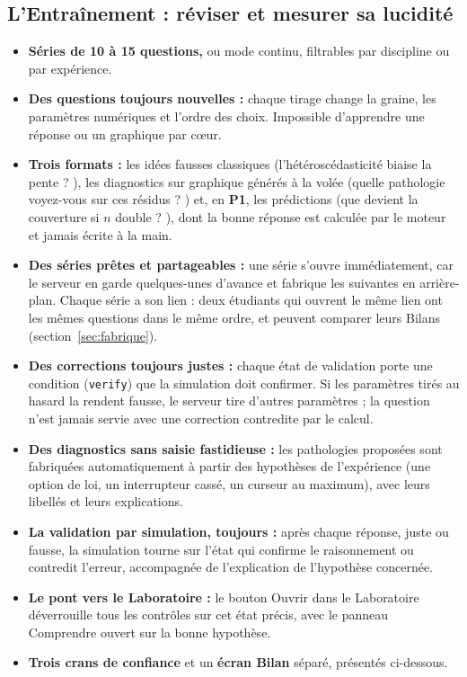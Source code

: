\documentclass[11pt,a4paper]{article}
\newcommand{\pone}{\colorbox{ctMethod!18}{\footnotesize\textbf{P1}}}
\begin{document}
\subsection{L'Entraînement : réviser et mesurer sa lucidité}
\begin{itemize}[leftmargin=*]
  \item \textbf{Séries de 10 à 15 questions,} ou mode continu, filtrables par discipline ou par expérience.
  \item \textbf{Des questions toujours nouvelles :} chaque tirage change la graine, les paramètres numériques et l'ordre des choix. Impossible d'apprendre une réponse ou un graphique par cœur.
  \item \textbf{Trois formats :} les idées fausses classiques (\og l'hétéroscédasticité biaise la pente ? \fg{}), les diagnostics sur graphique générés à la volée (\og quelle pathologie voyez-vous sur ces résidus ? \fg{}) et, en \pone{}, les prédictions (\og que devient la couverture si $n$ double ? \fg{}), dont la bonne réponse est calculée par le moteur et jamais écrite à la main.
  \item \textbf{Des séries prêtes et partageables :} une série s'ouvre immédiatement, car le serveur en garde quelques-unes d'avance et fabrique les suivantes en arrière-plan. Chaque série a son lien : deux étudiants qui ouvrent le même lien ont les mêmes questions dans le même ordre, et peuvent comparer leurs Bilans (section~\ref{sec:fabrique}).
  \item \textbf{Des corrections toujours justes :} chaque état de validation porte une condition (\texttt{verify}) que la simulation doit confirmer. Si les paramètres tirés au hasard la rendent fausse, le serveur tire d'autres paramètres ; la question n'est jamais servie avec une correction contredite par le calcul.
  \item \textbf{Des diagnostics sans saisie fastidieuse :} les pathologies proposées sont fabriquées automatiquement à partir des hypothèses de l'expérience (une option de loi, un interrupteur cassé, un curseur au maximum), avec leurs libellés et leurs explications.
  \item \textbf{La validation par simulation, toujours :} après chaque réponse, juste ou fausse, la simulation tourne sur l'état qui confirme le raisonnement ou contredit l'erreur, accompagnée de l'explication de l'hypothèse concernée.
  \item \textbf{Le pont vers le Laboratoire :} le bouton \og Ouvrir dans le Laboratoire \fg{} déverrouille tous les contrôles sur cet état précis, avec le panneau Comprendre ouvert sur la bonne hypothèse.
  \item \textbf{Trois crans de confiance} et un \textbf{écran Bilan} séparé, présentés ci-dessous.
\end{itemize}
\end{document}
